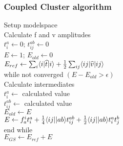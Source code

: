 \begin{frame}
\frametitle{Coupled Cluster algorithm}
\begin{center}
\begin{fmpage}{7.7cm}
\hspace*{0.4cm} Setup modelspace \\ 
\hspace*{0.4cm} Calculate f and v amplitudes \\
\hspace*{0.4cm} $t_i^a \gets 0$; $t_{ij}^{ab} \gets 0$ \\
\hspace*{0.4cm} $E \gets 1$; $E_{old} \gets 0$ \\ \pause
\hspace*{0.4cm} $E_{ref} \gets \sum_{i} \langle i| \widehat{t} |i\rangle +
    \frac{1}{2} \sum_{ij} \langle ij| \widehat{v} |ij\rangle$ \\ \pause
\hspace*{0.4cm} while not converged $(E - E_{old} > \epsilon)$ \\ \pause
\hspace*{0.8cm} Calculate intermediates \\ \pause
\hspace*{0.8cm} $t_i^a \gets $ calculated value \\
\hspace*{0.8cm} $t_{ij}^{ab} \gets $ calculated value \\ \pause
\hspace*{0.8cm} $E_{old} \gets E$ \\
\hspace*{0.8cm} $E \gets f_a^i t_i^a + \frac{1}{4} \langle ij||ab\rangle t_{ij}^{ab} + \frac{1}{2} \langle ij||ab\rangle  t_i^a  t_j^b$ \\ \pause
\hspace*{0.4cm} end while \\
\hspace*{0.4cm} $E_{GS} \gets E_{ref} + E$
\end{fmpage}
\end{center}
\end{frame}
